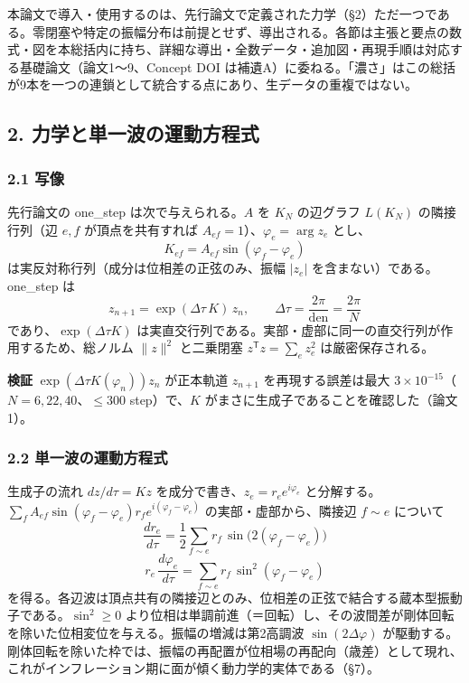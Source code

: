 \documentclass[
  a4paper,
]{ltjsarticle}
\begin{document}
本論文で導入・使用するのは、先行論文で定義された力学（§2）ただ一つである。零閉塞や特定の振幅分布は前提とせず、導出される。各節は主張と要点の数式・図を本総括内に持ち、詳細な導出・全数データ・追加図・再現手順は対応する基礎論文（論文1〜9、Concept
DOI
は補遺A）に委ねる。「濃さ」はこの総括が9本を一つの連鎖として統合する点にあり、生データの重複ではない。

\subsection{2.
力学と単一波の運動方程式}\label{ux529bux5b66ux3068ux5358ux4e00ux6ce2ux306eux904bux52d5ux65b9ux7a0bux5f0f}

\subsubsection{2.1 写像}\label{ux5199ux50cf}

先行論文の one\_step は次で与えられる。\(A\) を \(K_N\) の辺グラフ
\(L(K_N)\) の隣接行列（辺 \(e,f\) が頂点を共有すれば
\(A_{ef}=1\)）、\(\varphi_e=\arg z_e\) とし、
\[K_{ef}=A_{ef}\sin(\varphi_f-\varphi_e)\]
は実反対称行列（成分は位相差の正弦のみ、振幅 \(|z_e|\)
を含まない）である。one\_step は
\[z_{n+1}=\exp(\Delta\tau\,K)\,z_n,\qquad \Delta\tau=\frac{2\pi}{\mathrm{den}}=\frac{2\pi}{N}\]
であり、\(\exp(\Delta\tau K)\)
は実直交行列である。実部・虚部に同一の直交行列が作用するため、総ノルム
\(\|z\|^2\) と二乗閉塞 \(z^{\mathsf T}z=\sum_e z_e^2\)
は厳密保存される。

\textbf{検証} \(\exp(\Delta\tau K(\varphi_n))z_n\) が正本軌道
\(z_{n+1}\) を再現する誤差は最大
\(3\times10^{-15}\)（\(N=6,22,40\)、\(\le300\) step）で、\(K\)
がまさに生成子であることを確認した（論文1）。

\subsubsection{2.2
単一波の運動方程式}\label{ux5358ux4e00ux6ce2ux306eux904bux52d5ux65b9ux7a0bux5f0f}

生成子の流れ \(dz/d\tau=Kz\) を成分で書き、\(z_e=r_e e^{i\varphi_e}\)
と分解する。\(\sum_f A_{ef}\sin(\varphi_f-\varphi_e)r_f e^{i(\varphi_f-\varphi_e)}\)
の実部・虚部から、隣接辺 \(f\sim e\) について
\[\boxed{\ \frac{dr_e}{d\tau}=\frac12\sum_{f\sim e}r_f\,\sin\!\big(2(\varphi_f-\varphi_e)\big)\ }\tag{振幅}\]
\[\boxed{\ r_e\,\frac{d\varphi_e}{d\tau}=\sum_{f\sim e}r_f\,\sin^2(\varphi_f-\varphi_e)\ }\tag{位相}\]
を得る。各辺波は頂点共有の隣接辺とのみ、位相差の正弦で結合する蔵本型振動子である。\(\sin^2\ge0\)
より位相は単調前進（＝回転）し、その波間差が剛体回転を除いた位相変位を与える。振幅の増減は第2高調波
\(\sin(2\Delta\varphi)\)
が駆動する。剛体回転を除いた枠では、振幅の再配置が位相場の再配向（歳差）として現れ、これがインフレーション期に面が傾く動力学的実体である（§7）。
\end{document}
